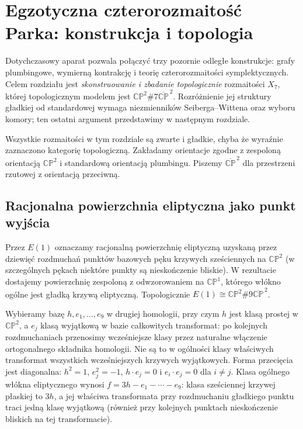 \chapter{Egzotyczna czterorozmaitość Parka: konstrukcja i topologia}
\label{ch:tg-park}

Dotychczasowy aparat pozwala połączyć trzy pozornie odległe
konstrukcje: grafy plumbingowe, wymierną kontrakcję i teorię
czterorozmaitości symplektycznych. Celem rozdziału jest
\emph{skonstruowanie i zbadanie topologicznie} rozmaitości
$X_7$, której topologicznym modelem jest
$\mathbb{CP}^{2}\#7\overline{\mathbb{CP}}^{\,2}$.
Rozróżnienie jej struktury gładkiej od standardowej wymaga
niezmienników Seiberga--Wittena oraz wyboru komory; ten
ostatni argument przedstawimy w następnym rozdziale.

Wszystkie rozmaitości w tym rozdziale są zwarte i gładkie,
chyba że wyraźnie zaznaczono kategorię topologiczną.
Zakładamy orientacje zgodne z zespoloną orientacją
$\mathbb{CP}^{2}$ i standardową orientacją plumbingu.
Piszemy $\overline{\mathbb{CP}}^{\,2}$ dla przestrzeni
rzutowej z orientacją przeciwną.

\section{Racjonalna powierzchnia eliptyczna jako punkt wyjścia}
\label{sec:tg-park-e1}

\begin{definicja}
Przez $E(1)$ oznaczamy racjonalną powierzchnię
eliptyczną uzyskaną przez dziewięć rozdmuchań
punktów bazowych pęku krzywych sześciennych
na $\mathbb{CP}^{2}$ (w szczególnych pękach
niektóre punkty są nieskończenie bliskie).
W rezultacie dostajemy powierzchnię zespoloną z odwzorowaniem na $\mathbb{CP}^{1}$, którego
włókno ogólne jest gładką krzywą eliptyczną. Topologicznie
$E(1)\cong\mathbb{CP}^{2}\#9\overline{\mathbb{CP}}^{\,2}$.
\end{definicja}

Wybieramy bazę $h,e_1,\ldots,e_9$ w drugiej homologii,
przy czym $h$ jest klasą prostej w $\mathbb{CP}^{2}$,
a $e_j$ klasą wyjątkową w bazie całkowitych
transformat: po kolejnych rozdmuchaniach przenosimy
wcześniejsze klasy przez naturalne włączenie
ortogonalnego składnika homologii. Nie są to
w ogólności klasy właściwych transformat wszystkich
wcześniejszych krzywych wyjątkowych. Forma przecięcia jest
diagonalna: $h^2=1$, $e_j^2=-1$, $h\cdot e_j=0$
i $e_i\cdot e_j=0$ dla $i\ne j$.
Klasa ogólnego włókna eliptycznego wynosi
$f=3h-e_1-\cdots-e_9$: klasa sześciennej krzywej
płaskiej to $3h$, a jej właściwa transformata
przy rozdmuchaniu gładkiego punktu traci jedną
klasę wyjątkową (również przy kolejnych punktach
nieskończenie bliskich na tej transformacie).

